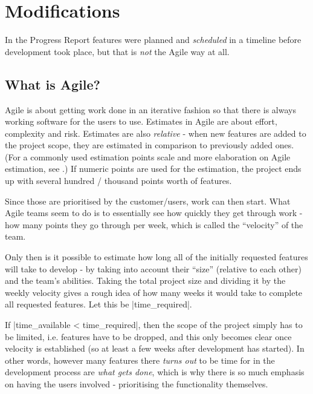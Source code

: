 
\section{Modifications}
In the Progress Report features were planned and \emph{scheduled} in a timeline before development took place, but that is \emph{not} the Agile way at all.

\subsection{What is Agile?}
Agile is about getting work done in an iterative fashion so that there is always working software for the users to use. Estimates in Agile are about effort, complexity and risk. Estimates are also \emph{relative} - when new features are added to the project scope, they are estimated in comparison to previously added ones. (For a commonly used estimation points scale and more elaboration on Agile estimation, see \cite{agile-estimate}.) If numeric points are used for the estimation, the project ends up with several hundred / thousand points worth of features.

Since those are prioritised by the customer/users, work can then start. What Agile teams seem to do is to essentially see how quickly they get through work - how many points they go through per week, which is called the ``velocity'' of the team.

Only then is it possible to estimate how long all of the initially requested features will take to develop - by taking into account their ``size'' (relative to each other) and the team's abilities. Taking the total project size and dividing it by the weekly velocity gives a rough idea of how many weeks it would take to complete all requested features. Let this be |time_required|.

If |time_available < time_required|, then the scope of the project simply has to be limited, i.e. features have to be dropped, and this only becomes clear once velocity is established (so at least a few weeks after development has started). In other words, however many features there \emph{turns out} to be time for in the development process are \emph{what gets done}, which is why there is so much emphasis on having the users involved - prioritising the functionality themselves.

